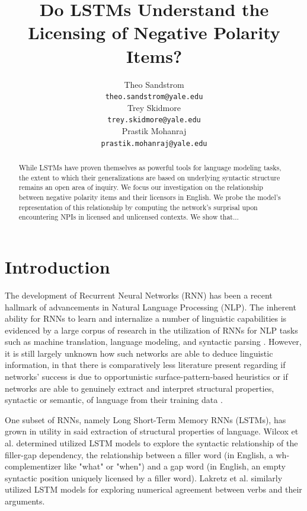 \documentclass[11pt, round]{article}
\title{Do LSTMs Understand the Licensing of Negative Polarity Items?}
\author{Theo Sandstrom \\
  \texttt{theo.sandstrom@yale.edu} \\
  Trey Skidmore \\
  \texttt{trey.skidmore@yale.edu} \\
  Prastik Mohanraj \\
  \texttt{prastik.mohanraj@yale.edu}}
\begin{document}
\maketitle

\begin{abstract}
While LSTMs have proven themselves as powerful tools for language modeling tasks, the extent to which their generalizations are based on underlying syntactic structure remains an open area of inquiry. We focus our investigation on the relationship between negative polarity items and their licensors in English. We probe the model's representation of this relationship by computing the network's surprisal upon encountering NPIs in licensed and unlicensed contexts. We show that...
\end{abstract}

\section{Introduction}

The development of Recurrent Neural Networks (RNN) has been a recent hallmark of advancements in Natural Language Processing (NLP). The inherent ability for RNNs to learn and internalize a number of linguistic capabilities is evidenced by a large corpus of research in the utilization of RNNs for NLP tasks such as machine translation, language modeling, and syntactic parsing \cite{wilcox-etal-2018-rnn}. However, it is still largely unknown how such networks are able to deduce linguistic information, in that there is comparatively less literature present regarding if networks' success is due to opportunistic surface-pattern-based heuristics or if networks are able to genuinely extract and interpret structural properties, syntactic or semantic, of language from their training data \cite{lakretz2019emergence}.

One subset of RNNs, namely Long Short-Term Memory RNNs (LSTMs), has grown in utility in said extraction of structural properties of language. Wilcox et al.  determined utilized LSTM models to explore the syntactic relationship of the filler-gap dependency, the relationship between a filler word (in English, a wh- complementizer like "what" or "when") and a gap word (in English, an empty syntactic position uniquely licensed by a filler word). Lakretz et al.  similarly utilized LSTM models for exploring numerical agreement between verbs and their arguments. 
\end{document}
